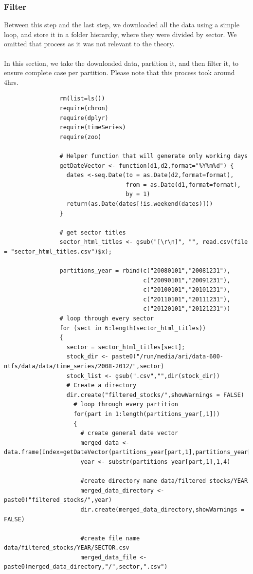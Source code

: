 \documentclass[12pt,titlepage,letter]{article}
\begin{document}
		\subsubsection{Filter}
			Between this step and the last step, we downloaded all the data using a simple loop, and store it in a folder hierarchy, where they were divided by sector. We omitted that process as it was not relevant to the theory. \\
			\\
			In this section, we take the downloaded data, partition it, and then filter it, to ensure complete case per partition. Please note that this process took around 4hrs.
			\begin{verbatim}
				rm(list=ls())
				require(chron)
				require(dplyr)
				require(timeSeries)
				require(zoo)

				# Helper function that will generate only working days
				getDateVector <- function(d1,d2,format="%Y%m%d") {
				  dates <-seq.Date(to = as.Date(d2,format=format),
				                   from = as.Date(d1,format=format),
				                   by = 1)
				  return(as.Date(dates[!is.weekend(dates)]))
				}

				# get sector titles
				sector_html_titles <- gsub("[\r\n]", "", read.csv(file = "sector_html_titles.csv")$x);

				partitions_year = rbind(c("20080101","20081231"),
				                        c("20090101","20091231"),
				                        c("20100101","20101231"),
				                        c("20110101","20111231"),
				                        c("20120101","20121231"))
				# loop through every sector
				for (sect in 6:length(sector_html_titles))
				{
				  sector = sector_html_titles[sect];
				  stock_dir <- paste0("/run/media/ari/data-600-ntfs/data/data/time_series/2008-2012/",sector)
				  stock_list <- gsub(".csv","",dir(stock_dir))
				  # Create a directory
				  dir.create("filtered_stocks/",showWarnings = FALSE)
				    # loop through every partition
				    for(part in 1:length(partitions_year[,1]))
				    {
				      # create general date vector
				      merged_data <- data.frame(Index=getDateVector(partitions_year[part,1],partitions_year[part,2]))
				      year <- substr(partitions_year[part,1],1,4)
				      
				      #create directory name data/filtered_stocks/YEAR
				      merged_data_directory <- paste0("filtered_stocks/",year)
				      dir.create(merged_data_directory,showWarnings = FALSE)
				      
				      #create file name data/filtered_stocks/YEAR/SECTOR.csv
				      merged_data_file <- paste0(merged_data_directory,"/",sector,".csv")
				      

\end{verbatim}
\end{document}
